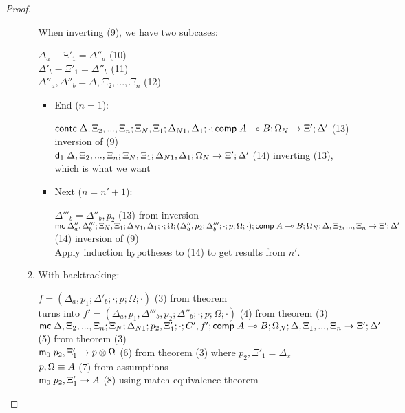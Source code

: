 \begin{proof}
\begin{itemize}
\begin{enumerate}
         When inverting (9), we have two subcases:
      
         $\Delta_a - \Xi'_1 = \Delta''_a$ \hfill (10) \\
         $\Delta'_b - \Xi'_1 = \Delta''_b$ \hfill (11) \\
         $\Delta''_a, \Delta''_b = \Delta, \Xi_2, ..., \Xi_n$ \hfill (12) \\
      
         \begin{itemize}
            \item End ($n = 1$):
         
            $\mathsf{contc} \; \Delta, \Xi_2, ..., \Xi_n; \Xi_N, \Xi_1; \Delta_{N1}, \Delta_1; \cdot; \mathsf{comp} \; A \multimap B; \Omega_N \rightarrow \Xi'; \Delta'$ \hfill (13) \hfill inversion of (9) \\
            $\mathsf{d}_1 \; \Delta, \Xi_2, ..., \Xi_n; \Xi_N, \Xi_1; \Delta_{N1}, \Delta_1; \Omega_N \rightarrow \Xi'; \Delta'$ \hfill (14) inverting (13), which is what we want \\
         
            \item Next ($n = n' + 1$):
         
            $\Delta'''_b = \Delta''_b, p_2$ \hfill (13) from inversion \\
            $\mathsf{mc} \; \Delta''_a, \Delta'''_b; \Xi_N, \Xi_1; \Delta_{N1}, \Delta_1; \cdot; \Omega; (\Delta''_a, p_2; \Delta'''_b; \cdot; p; \Omega; \cdot); \mathsf{comp} \; A \multimap B; \Omega_N; \Delta, \Xi_2, ..., \Xi_n \rightarrow \Xi'; \Delta'$ \hfill (14) inversion of (9) \\
            Apply induction hypotheses to (14) to get results from $n'$.\\ 
         \end{itemize}
      
         \item With backtracking:
   
         $f = (\Delta_a, p_1; \Delta'_b; \cdot; p; \Omega; \cdot)$ \hfill (3) from theorem \\
         turns into $f' = (\Delta_a, p_1, \Delta'''_b, p_2; \Delta''_b; \cdot; p; \Omega; \cdot)$ \hfill (4) from theorem (3) \\
         $\mathsf{mc} \; \Delta, \Xi_2, ..., \Xi_n; \Xi_N; \Delta_{N1}; p_2, \Xi'_1; \cdot; C', f'; \mathsf{comp} \; A \multimap B; \Omega_N; \Delta, \Xi_1, ..., \Xi_n \rightarrow \Xi'; \Delta'$ \hfill (5) from theorem (3) \\
         $\mathsf{m}_0 \; p_2, \Xi'_1 \rightarrow p \otimes \Omega$ \hfill (6) from theorem (3) where $p_2, \Xi'_1 = \Delta_x$ \\
         $p, \Omega \equiv A$ \hfill (7) from assumptions \\
         $\mathsf{m}_0 \; p_2, \Xi'_1 \rightarrow A$ \hfill (8) using match equivalence theorem \\
   

\end{enumerate}
\end{itemize}
\end{proof}
